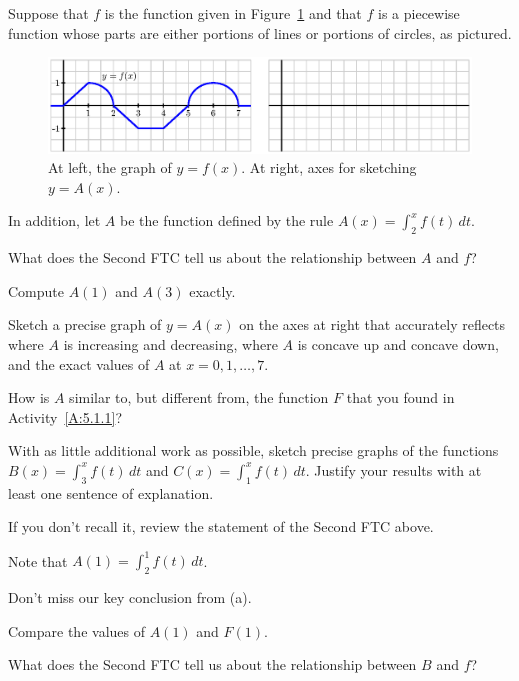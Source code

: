 \begin{activity} \label{A:5.2.1}  Suppose that $f$ is the function given in Figure~\ref{F:5.2.Act1} and that $f$ is a piecewise function whose parts are either portions of lines or portions of circles, as pictured.
\begin{figure}[h]
\begin{center}
\includegraphics{figures/5_2_Act1.eps}
\end{center}
\caption{At left, the graph of $y = f(x)$.  At right, axes for sketching $y = A(x)$.} \label{F:5.2.Act1}
\end{figure}
In addition, let $A$ be the function defined by the rule $A(x) = \int_2^x f(t) \, dt$.
\ba
	\item What does the Second FTC tell us about the relationship between $A$ and $f$?
	\item Compute $A(1)$ and $A(3)$ exactly.
	\item Sketch a precise graph of $y = A(x)$ on the axes at right that accurately reflects where $A$ is increasing and decreasing, where $A$ is concave up and concave down, and the exact values of $A$ at $x = 0, 1, \ldots, 7$.
	\item How is $A$ similar to, but different from, the function $F$ that you found in Activity~\ref{A:5.1.1}?
	\item With as little additional work as possible, sketch precise graphs of the functions $B(x) = \int_3^x f(t) \, dt$ and $C(x) = \int_1^x f(t) \, dt$.  Justify your results with at least one sentence of explanation.
\ea
\end{activity}
\begin{smallhint}
\ba
	\item If you don't recall it, review the statement of the Second FTC above.
	\item Note that $A(1)= \int_2^1 f(t) \, dt$.
	\item Don't miss our key conclusion from (a).
	\item Compare the values of $A(1)$ and $F(1)$.
	\item What does the Second FTC tell us about the relationship between $B$ and $f$?
\ea
\end{smallhint}
